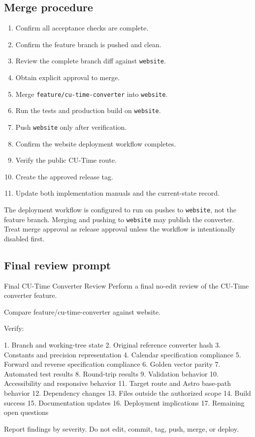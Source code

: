 \documentclass[11pt,letterpaper]{article}
\newcommand{\branchname}[1]{\texttt{#1}}
\begin{document}
\subsection{Merge procedure}

\begin{enumerate}
    \item Confirm all acceptance checks are complete.
    \item Confirm the feature branch is pushed and clean.
    \item Review the complete branch diff against \branchname{website}.
    \item Obtain explicit approval to merge.
    \item Merge \branchname{feature/cu-time-converter} into \branchname{website}.
    \item Run the tests and production build on \branchname{website}.
    \item Push \branchname{website} only after verification.
    \item Confirm the website deployment workflow completes.
    \item Verify the public CU-Time route.
    \item Create the approved release tag.
    \item Update both implementation manuals and the current-state record.
\end{enumerate}

\begin{warningbox}
The deployment workflow is configured to run on pushes to
\branchname{website}, not the feature branch. Merging and pushing to
\branchname{website} may publish the converter. Treat merge approval as release
approval unless the workflow is intentionally disabled first.
\end{warningbox}

\subsection{Final review prompt}

\begin{promptbox}{Final CU-Time Converter Review}
Perform a final no-edit review of the CU-Time converter feature.

Compare feature/cu-time-converter against website.

Verify:

1. Branch and working-tree state
2. Original reference converter hash
3. Constants and precision representation
4. Calendar specification compliance
5. Forward and reverse specification compliance
6. Golden vector parity
7. Automated test results
8. Round-trip results
9. Validation behavior
10. Accessibility and responsive behavior
11. Target route and Astro base-path behavior
12. Dependency changes
13. Files outside the authorized scope
14. Build success
15. Documentation updates
16. Deployment implications
17. Remaining open questions

Report findings by severity.
Do not edit, commit, tag, push, merge, or deploy.
\end{promptbox}
\end{document}

